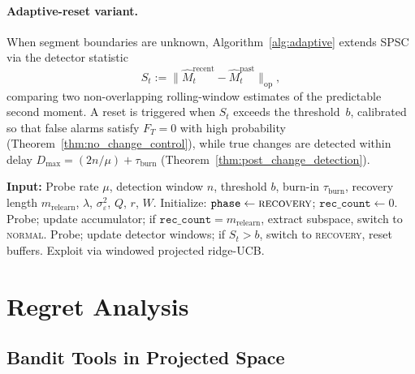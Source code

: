 \documentclass[11pt]{article}
\newcommand{\op}{\mathrm{op}}
\begin{document}
\paragraph{Adaptive-reset variant.}
When segment boundaries are unknown, Algorithm~\ref{alg:adaptive} extends SPSC via
the detector statistic
\begin{equation}
  S_t := \|\widehat{M}_t^{\mathrm{recent}}-\widehat{M}_t^{\mathrm{past}}\|_{\op},
  \label{eq:detector_stat}
\end{equation}
comparing two non-overlapping rolling-window estimates of the predictable second moment.
A reset is triggered when $S_t$ exceeds the threshold~$b$, calibrated so that
false alarms satisfy $F_T=0$ with high probability
(Theorem~\ref{thm:no_change_control}), while true changes are detected within delay
$D_{\max}=(2n/\mu)+\tau_{\mathrm{burn}}$
(Theorem~\ref{thm:post_change_detection}).

\begin{algorithm}[t]
\caption{Adaptive SPSC (Unknown Segment Boundaries)}
\label{alg:adaptive}
\begin{algorithmic}[1]
\State \textbf{Input:} Probe rate $\mu$, detection window $n$, threshold $b$,
       burn-in $\tau_{\mathrm{burn}}$, recovery length $m_{\mathrm{relearn}}$,
       $\lambda$, $\sigma_\varepsilon^2$, $Q$, $r$, $W$.
\State Initialize: $\mathtt{phase}\leftarrow\textsc{recovery}$;
       $\mathtt{rec\_count}\leftarrow 0$.
        \State Probe; update accumulator; if
               $\mathtt{rec\_count}=m_{\mathrm{relearn}}$, extract subspace,
               switch to \textsc{normal}.
    \Else
            \State Probe; update detector windows; if $S_t>b$, switch to
                   \textsc{recovery}, reset buffers.
        \Else
            \State Exploit via windowed projected ridge-UCB.
        \EndIf
    \EndIf
\EndFor
\end{algorithmic}
\end{algorithm}


\section{Regret Analysis}
\label{sec:regret}

\subsection{Bandit Tools in Projected Space}
\label{sec:bandit_tools}
\end{document}
